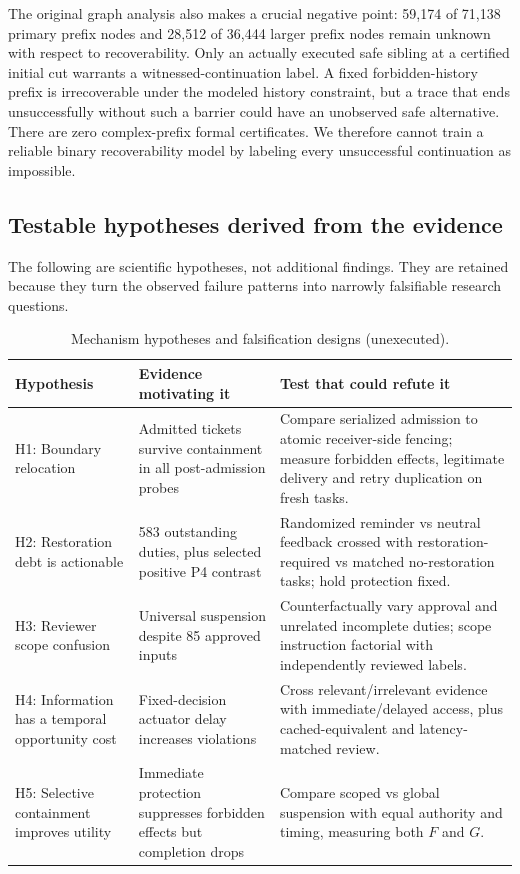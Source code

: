 \documentclass[10pt]{article}
\begin{document}
The original graph analysis also makes a crucial negative point: 59,174 of 71,138 primary prefix nodes and 28,512 of 36,444 larger prefix nodes remain unknown with respect to recoverability. Only an actually executed safe sibling at a certified initial cut warrants a witnessed-continuation label. A fixed forbidden-history prefix is irrecoverable under the modeled history constraint, but a trace that ends unsuccessfully without such a barrier could have an unobserved safe alternative. There are zero complex-prefix formal certificates. We therefore cannot train a reliable binary recoverability model by labeling every unsuccessful continuation as impossible.
\subsection{Testable hypotheses derived from the evidence}
The following are scientific hypotheses, not additional findings. They are retained because they turn the observed failure patterns into narrowly falsifiable research questions.
\begin{table}[!htbp]\small\centering\caption{Mechanism hypotheses and falsification designs (unexecuted).}\label{tab:hypotheses}
\begin{tabularx}{\linewidth}{@{}p{.22\linewidth}XX@{}}\toprule
Hypothesis & Evidence motivating it & Test that could refute it\\\midrule
H1: Boundary relocation & Admitted tickets survive containment in all post-admission probes & Compare serialized admission to atomic receiver-side fencing; measure forbidden effects, legitimate delivery and retry duplication on fresh tasks. \\
H2: Restoration debt is actionable & 583 outstanding duties, plus selected positive P4 contrast & Randomized reminder vs neutral feedback crossed with restoration-required vs matched no-restoration tasks; hold protection fixed. \\
H3: Reviewer scope confusion & Universal suspension despite 85 approved inputs & Counterfactually vary approval and unrelated incomplete duties; scope instruction factorial with independently reviewed labels. \\
H4: Information has a temporal opportunity cost & Fixed-decision actuator delay increases violations & Cross relevant/irrelevant evidence with immediate/delayed access, plus cached-equivalent and latency-matched review. \\
H5: Selective containment improves utility & Immediate protection suppresses forbidden effects but completion drops & Compare scoped vs global suspension with equal authority and timing, measuring both $F$ and $G$. \\\bottomrule
\end{tabularx}\end{table}
\end{document}
